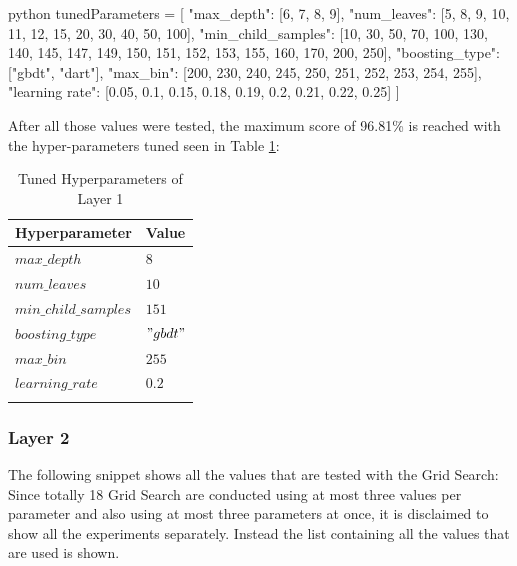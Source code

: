 
\begin{mintedbox}{python}
tunedParameters = [
    {"max_depth": [6, 7, 8, 9],
     "num_leaves": [5, 8, 9, 10, 11, 12, 15, 20, 30, 40, 50, 100],
     "min_child_samples": [10, 30, 50, 70, 100, 130, 140, 145, 147, 149, 150, 151, 152, 153, 155, 160, 170, 200, 250],
     "boosting_type": ["gbdt", "dart"],
     "max_bin": [200, 230, 240, 245, 250, 251, 252, 253, 254, 255],
     "learning rate": [0.05, 0.1, 0.15, 0.18, 0.19, 0.2, 0.21, 0.22, 0.25]
     }
]
\end{mintedbox}

After all those values were tested, the maximum score of 96.81\% is reached with the hyper-parameters tuned seen in Table \ref{tab:hyp_l1}:

\begin{center}
\begin{longtable}{ |l|l| }
\hline
Hyperparameter & Value \\
\hline
$max\_depth$ & $8$ \\
\hline
$num\_leaves$ & $10$ \\
\hline
$min\_child\_samples$ & $151$ \\
\hline
$boosting\_type$ & $"gbdt"$ \\
\hline
$max\_bin$ & $255$ \\
\hline
$learning\_rate$ & $0.2$ \\
\hline
\caption{Tuned Hyperparameters of Layer 1}
\label{tab:hyp_l1}
\end{longtable}
\end{center}

\subsubsection{Layer 2}
The following snippet shows all the values that are tested with the Grid Search: Since totally 18 Grid Search are conducted using at most three values per parameter and also using at most three parameters at once, it is disclaimed to show all the experiments separately. Instead the list containing all the values that are used is shown.

